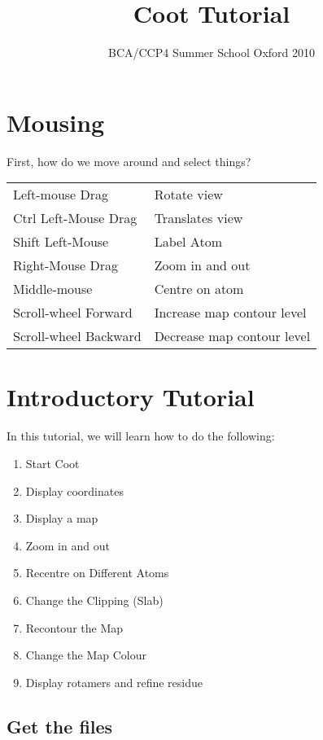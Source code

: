 \documentclass{article}
\title{Coot Tutorial}
\author{BCA/CCP4 Summer School Oxford 2010}
\begin{document}
\maketitle
\tableofcontents


\newpage

\section{Mousing}

First, how do we move around and select things?

\vspace{0.5cm}
  \begin{tabular}{ll}
    Left-mouse Drag & Rotate view \\
    Ctrl Left-Mouse Drag &  Translates view \\
    Shift Left-Mouse &  Label Atom\\
    Right-Mouse Drag &  Zoom in and out\index{zoom}\\
    Middle-mouse & Centre on atom\\
    Scroll-wheel Forward &  Increase map contour level\\
    Scroll-wheel Backward &  Decrease map contour level
  \end{tabular}
\vspace{0.5cm}

\section{Introductory Tutorial}

In this tutorial, we will learn how to do the following:
\begin{enumerate}
\item Start Coot
\item Display coordinates
\item Display a map
\item Zoom in and out
\item Recentre on Different Atoms
\item Change the Clipping (Slab)
\item Recontour the Map
\item Change the Map Colour
\item Display rotamers and refine residue
\end{enumerate}

\subsection{Get the files}
\end{document}
